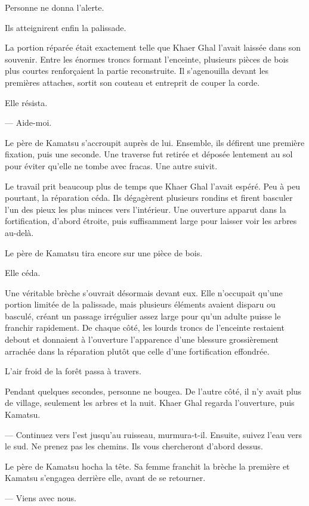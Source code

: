 Personne ne donna l'alerte.

Ils atteignirent enfin la palissade.

La portion réparée était exactement telle que Khaer Ghal l'avait laissée dans
son souvenir. Entre les énormes troncs formant l'enceinte, plusieurs pièces de
bois plus courtes renforçaient la partie reconstruite. Il s'agenouilla devant
les premières attaches, sortit son couteau et entreprit de couper la corde.

Elle résista.

— Aide-moi.

Le père de Kamatsu s'accroupit auprès de lui. Ensemble, ils défirent une
première fixation, puis une seconde. Une traverse fut retirée et déposée
lentement au sol pour éviter qu'elle ne tombe avec fracas. Une autre suivit.

Le travail prit beaucoup plus de temps que Khaer Ghal l'avait espéré. Peu à
peu pourtant, la réparation céda. Ils dégagèrent plusieurs rondins et firent
basculer l'un des pieux les plus minces vers l'intérieur. Une ouverture apparut
dans la fortification, d'abord étroite, puis suffisamment large pour laisser
voir les arbres au-delà.

Le père de Kamatsu tira encore sur une pièce de bois.

Elle céda.

Une véritable brèche s'ouvrait désormais devant eux. Elle n'occupait qu'une
portion limitée de la palissade, mais plusieurs éléments avaient disparu ou
basculé, créant un passage irrégulier assez large pour qu'un adulte puisse le
franchir rapidement. De chaque côté, les lourds troncs de l'enceinte restaient
debout et donnaient à l'ouverture l'apparence d'une blessure grossièrement
arrachée dans la réparation plutôt que celle d'une fortification effondrée.

L'air froid de la forêt passa à travers.

Pendant quelques secondes, personne ne bougea. De l'autre côté, il n'y avait
plus de village, seulement les arbres et la nuit. Khaer Ghal regarda
l'ouverture, puis Kamatsu.

— Continuez vers l'est jusqu'au ruisseau, murmura-t-il. Ensuite, suivez l'eau
vers le sud. Ne prenez pas les chemins. Ils vous chercheront d'abord dessus.

Le père de Kamatsu hocha la tête. Sa femme franchit la brèche la première et
Kamatsu s'engagea derrière elle, avant de se retourner.

— Viens avec nous.

